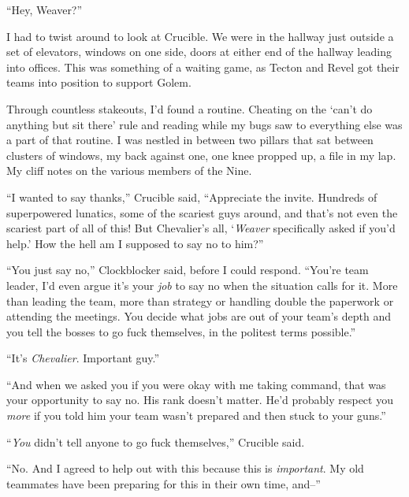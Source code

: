 





``Hey, Weaver?''



I had to twist around to look at Crucible.  We were in the hallway just outside a set of elevators, windows on one side, doors at either end of the hallway leading into offices.  This was something of a waiting game, as Tecton and Revel got their teams into position to support Golem.



Through countless stakeouts, I'd found a routine.  Cheating on the `can't do anything but sit there' rule and reading while my bugs saw to everything else was a part of that routine.  I was nestled in between two pillars that sat between clusters of windows, my back against one, one knee propped up, a file in my lap.  My cliff notes on the various members of the Nine.



``I wanted to say thanks,'' Crucible said, ``Appreciate the invite.  Hundreds of superpowered lunatics, some of the scariest guys around, and that's not even the scariest part of all of this!  But Chevalier's all, `\emph{Weaver} specifically asked if you'd help.'  How the hell am I supposed to say no to him?''



``You just say no,'' Clockblocker said, before I could respond.  ``You're team leader, I'd even argue it's your \emph{job }to say no when the situation calls for it.  More than leading the team, more than strategy or handling double the paperwork or attending the meetings.  You decide what jobs are out of your team's depth and you tell the bosses to go fuck themselves, in the politest terms possible.''



``It's \emph{Chevalier}.  Important guy.''



``And when we asked you if you were okay with me taking command, that was your opportunity to say no.  His rank doesn't matter.  He'd probably respect you \emph{more} if you told him your team wasn't prepared and then stuck to your guns.''



``\emph{You} didn't tell anyone to go fuck themselves,'' Crucible said.



``No.  And I agreed to help out with this because this is \emph{important}.  My old teammates have been preparing for this in their own time, and--''



